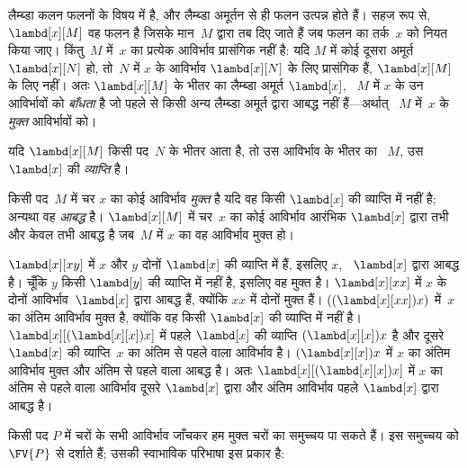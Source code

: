 \documentclass[../../../include/open-logic-section]{subfiles}
\begin{document}

लैम्ब्डा कलन फलनों के विषय में है, और लैम्ब्डा अमूर्तन से ही फलन उत्पन्न
होते हैं। सहज रूप से, $\lambd[x][M]$ वह फलन है जिसके मान~$M$ द्वारा तब दिए
जाते हैं जब फलन का तर्क~$x$ को नियत किया जाए। किंतु~$M$ में~$x$ का प्रत्येक
आविर्भाव प्रासंगिक नहीं है: यदि $M$ में कोई दूसरा अमूर्त
$\lambd[x][N]$ हो, तो~$N$ में $x$ के आविर्भाव $\lambd[x][N]$ के लिए
प्रासंगिक हैं, $\lambd[x][M]$ के लिए नहीं। अतः $\lambd[x][M]$ के भीतर का
लैम्ब्डा अमूर्त $\lambd[x]$, ~$M$ में $x$ के उन आविर्भावों को \emph{बाँधता}
है जो पहले से किसी अन्य लैम्ब्डा अमूर्त द्वारा आबद्ध नहीं हैं---अर्थात्
~$M$ में~$x$ के \emph{मुक्त} आविर्भावों को।

\begin{defn}[व्याप्ति]
यदि $\lambd[x][M]$ किसी पद~$N$ के भीतर आता है, तो उस आविर्भाव के भीतर का
~$M$, उस~$\lambd[x]$ की \emph{व्याप्ति} है।
\end{defn}


\begin{defn}[मुक्त और आबद्ध आविर्भाव]
  किसी पद~$M$ में चर $x$ का कोई आविर्भाव \emph{मुक्त} है यदि वह किसी
  $\lambd[x]$ की व्याप्ति में नहीं है; अन्यथा वह \emph{आबद्ध} है।
  $\lambd[x][M]$ में चर~$x$ का कोई आविर्भाव आरंभिक $\lambd[x]$ द्वारा तभी
  और केवल तभी आबद्ध है जब~$M$ में $x$ का वह आविर्भाव मुक्त हो।
\end{defn}

\begin{ex}
  $\lambd[x][x y]$ में $x$ और $y$ दोनों $\lambd[x]$ की व्याप्ति में हैं,
  इसलिए $x$, ~$\lambd[x]$ द्वारा आबद्ध है। चूँकि $y$ किसी $\lambd[y]$ की
  व्याप्ति में नहीं है, इसलिए वह मुक्त है। $\lambd[x][x x]$ में $x$ के
  दोनों आविर्भाव~$\lambd[x]$ द्वारा आबद्ध हैं, क्योंकि $xx$ में दोनों मुक्त
  हैं। $((\lambd[x][xx])x)$ में~$x$ का अंतिम आविर्भाव मुक्त है, क्योंकि वह
  किसी $\lambd[x]$ की व्याप्ति में नहीं है।
  $\lambd[x][(\lambd[x][x])x]$ में पहले $\lambd[x]$ की व्याप्ति
  $(\lambd[x][x])x$ है और दूसरे $\lambd[x]$ की व्याप्ति~$x$ का अंतिम से
  पहले वाला आविर्भाव है। $(\lambd[x][x])x$ में $x$ का अंतिम आविर्भाव मुक्त
  और अंतिम से पहले वाला आबद्ध है। अतः $\lambd[x][(\lambd[x][x])x]$ में
  $x$ का अंतिम से पहले वाला आविर्भाव दूसरे $\lambd[x]$ द्वारा और अंतिम
  आविर्भाव पहले $\lambd[x]$ द्वारा आबद्ध है।
\end{ex}

किसी पद $P$ में चरों के सभी आविर्भाव जाँचकर हम मुक्त चरों का समुच्चय पा
सकते हैं। इस समुच्चय को $\FV{P}$ से दर्शाते हैं; उसकी स्वाभाविक परिभाषा
इस प्रकार है:
\end{document}
